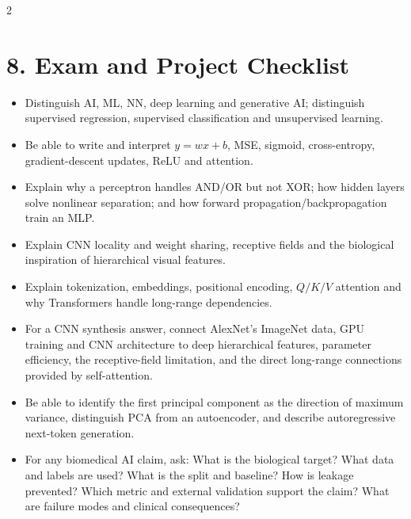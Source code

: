 \documentclass[10pt,a4paper]{ctexart}
\begin{document}
\begin{multicols*}{2}
\section{8. Exam and Project Checklist}
\begin{itemize}
  \item Distinguish AI, ML, NN, deep learning and generative AI; distinguish supervised regression, supervised classification and unsupervised learning.
  \item Be able to write and interpret \(y=wx+b\), MSE, sigmoid, cross-entropy, gradient-descent updates, ReLU and attention.
  \item Explain why a perceptron handles AND/OR but not XOR; how hidden layers solve nonlinear separation; and how forward propagation/backpropagation train an MLP.
  \item Explain CNN locality and weight sharing, receptive fields and the biological inspiration of hierarchical visual features.
  \item Explain tokenization, embeddings, positional encoding, \(Q/K/V\) attention and why Transformers handle long-range dependencies.
  \item For a CNN synthesis answer, connect AlexNet's ImageNet data, GPU training and CNN architecture
  to deep hierarchical features, parameter efficiency, the receptive-field limitation, and the
  direct long-range connections provided by self-attention.
  \item Be able to identify the first principal component as the direction of maximum variance,
  distinguish PCA from an autoencoder, and describe autoregressive next-token generation.
  \item For any biomedical AI claim, ask: What is the biological target? What data and labels are used? What is the split and baseline? How is leakage prevented? Which metric and external validation support the claim? What are failure modes and clinical consequences?
\end{itemize}

\end{multicols*}
\end{document}

